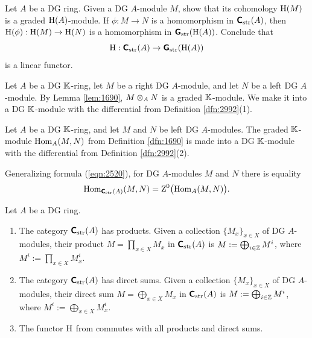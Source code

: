 \begin{exer} \label{exer:2521}
Let $A$ be a DG ring. Given a DG $A$-module $M$, show that its cohomology 
$\operatorname{H}(M)$ is a graded $\operatorname{H}(A)$-module. If $\phi : M \to N$
is a homomorphism in $\boldsymbol{\mathsf{C}}_{\mathrm{str}}(A)$, then 
$\operatorname{H}(\phi) : \operatorname{H}(M) \to \operatorname{H}(N)$
is a homomorphism in $\boldsymbol{\mathsf{G}}_{\mathrm{str}}(\operatorname{H}(A))$.
Conclude that 
\begin{equation} \label{eqn:4130}
\operatorname{H} : \boldsymbol{\mathsf{C}}_{\mathrm{str}}(A) \to \boldsymbol{\mathsf{G}}_{\mathrm{str}}(\operatorname{H}(A)) 
\end{equation}
is a linear functor.  
\end{exer}

\begin{dfn} \label{dfn:1100}
Let $A$ be a DG $\mathbb{K}$-ring, let $M$ be a right DG $A$-module, and 
let $N$ be a left DG $A$-module. By Lemma \ref{lem:1690}, $M \otimes_A N$
is a graded $\mathbb{K}$-module. We make it into a DG $\mathbb{K}$-module with the differential 
from Definition \ref{dfn:2992}(1). 
\end{dfn}

\begin{dfn} \label{dfn:1101}
Let $A$ be a DG $\mathbb{K}$-ring, and let $M$ and $N$ be left DG $A$-modules.
The graded $\mathbb{K}$-module $\operatorname{Hom}_{A}(M, N)$ from Definition \ref{dfn:1690}
is made into a DG $\mathbb{K}$-module with the differential from
Definition \ref{dfn:2992}(2). 
\end{dfn}

Generalizing formula (\ref{eqn:2520}), for DG $A$-modules $M$ and $N$ 
there is equality
\[ \operatorname{Hom}_{\boldsymbol{\mathsf{C}}_{\mathrm{str}}(A)}(M, N) = 
\operatorname{Z}^0 \bigl( \operatorname{Hom}_{A}(M, N) \bigr) . \]

\begin{prop} \label{prop:4131}
Let $A$ be a DG ring. 
\begin{enumerate}
\item The category $\boldsymbol{\mathsf{C}}_{\mathrm{str}}(A)$ has products. Given a collection 
$\{ M_x \}_{x \in X}$ of DG $A$-modules, their product 
$M  = \prod_{x \in X} M_x$ in $\boldsymbol{\mathsf{C}}_{\mathrm{str}}(A)$
is $M := \bigoplus_{i \in \mathbb{Z}}  M^i$, where 
$M^i := \prod_{x \in X} M_x^i$.

\item The category $\boldsymbol{\mathsf{C}}_{\mathrm{str}}(A)$ has direct sums. Given a 
collection $\{ M_x \}_{x \in X}$ of DG $A$-modules, their direct sum 
$M  = \bigoplus_{x \in X} M_x$ in $\boldsymbol{\mathsf{C}}_{\mathrm{str}}(A)$
is $M := \bigoplus_{i \in \mathbb{Z}}  M^i$, where 
$M^i := \bigoplus_{x \in X} M_x^i$.

\item The functor $\operatorname{H}$ from \tup{(\ref{eqn:4130})} commutes with all 
products and direct sums. 
\end{enumerate}
\end{prop}

